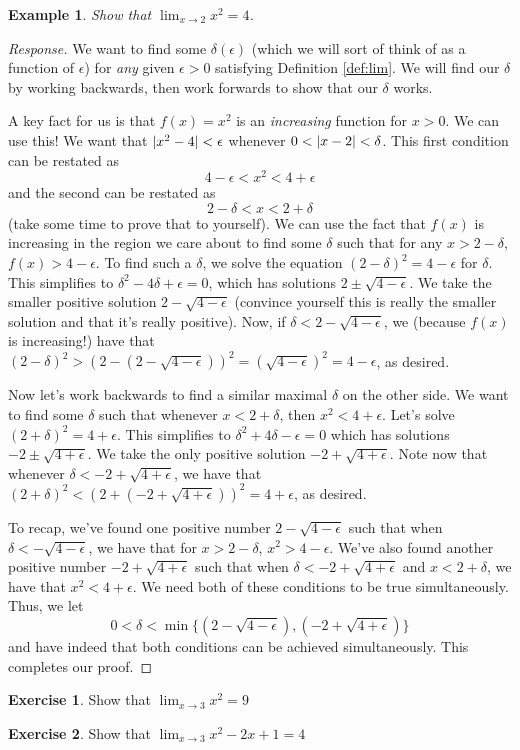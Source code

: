 \documentclass[english]{book}
\DeclarePairedDelimiter\abs{\lvert}{\rvert}%
\newtheorem{example}[theorem]{Example}
\theoremstyle{remark}
\theoremstyle{definition}
\newtheorem{excs}{Exercise}[chapter]
\newtheorem*{next week}{Next Week}
\newcommand{\dlim}{\displaystyle\lim}
\begin{document}
\begin{example}
	Show that $\dlim_{x\to 2}x^2=4$. 
\end{example}
\begin{proof}[Response]
	We want to find some $\delta(\epsilon)$ (which we will sort of think of as a function of $\epsilon$) for \emph{any} given $\epsilon>0$ satisfying Definition \ref{def:lim}. We will find our $\delta$ by working backwards, then work forwards to show that our $\delta$ works.

A key fact for us is that $f(x)=x^2$ is an \emph{increasing} function for $x>0$. We can use this! We want that $\abs{x^2-4}<\epsilon$ whenever $0<\abs{x-2}<\delta$. This first condition can be restated as $$4-\epsilon< x^2<4+\epsilon$$ and the second can be restated as $$2-\delta <x<2+\delta$$ (take some time to prove that to yourself).
We can use the fact that $f(x)$ is increasing in the region we care about to find some $\delta$ such that for any $x>2-\delta$, $f(x)>4-\epsilon$. To find such a $\delta$, we solve the equation $(2-\delta)^2=4-\epsilon$ for $\delta$. This simplifies to $\delta^2-4\delta+\epsilon=0$, which has solutions $2\pm \sqrt{4-\epsilon}$. We take the smaller positive solution $2-\sqrt{4-\epsilon}$ (convince yourself this is really the smaller solution and that it's really positive). Now, if $\delta<2-\sqrt{4-\epsilon}$, we (because $f(x)$ is increasing!) have that $(2-\delta)^2>(2-(2-\sqrt{4-\epsilon}))^2=(\sqrt{4-\epsilon})^2=4-\epsilon$, as desired.

Now let's work backwards to find a similar maximal $\delta$ on the other side. We want to find some $\delta$ such that whenever $x<2+\delta$, then $x^2<4+\epsilon$. Let's solve $(2+\delta)^2=4+\epsilon$. This simplifies to $\delta^2+4\delta-\epsilon=0$ which has solutions $-2\pm \sqrt{4+\epsilon}$. We take the only positive solution $-2+\sqrt{4+\epsilon}$. Note now that whenever $\delta<-2+\sqrt{4+\epsilon}$, we have that $(2+\delta)^2<(2+(-2+\sqrt{4+\epsilon}))^2=4+\epsilon$, as desired.

To recap, we've found one positive number $2-\sqrt{4-\epsilon}$ such that when $\delta<-\sqrt{4-\epsilon}$, we have that for $x>2-\delta$, $x^2>4-\epsilon$. We've also found another positive number $-2+\sqrt{4+\epsilon}$ such that when $\delta<-2+\sqrt{4+\epsilon}$ and $x<2+\delta$, we have that $x^2<4+\epsilon$. We need both of these conditions to be true simultaneously. Thus, we let $$0<\delta< \min \{(2-\sqrt{4-\epsilon}),(-2+\sqrt{4+\epsilon})\}$$ and have indeed that both conditions can be achieved simultaneously. This completes our proof. 
\end{proof}
\begin{excs} Show that $\dlim_{x\to 3}x^2=9$

	\end{excs}
\begin{excs} Show that $\dlim_{x\to 3}x^2-2x+1=4$
	
\end{excs}
\end{document}
